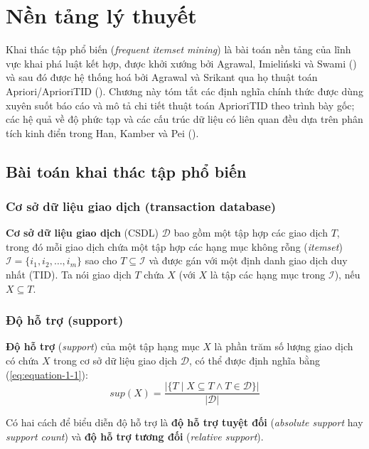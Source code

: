 \chapter[Nền tảng lý thuyết]{Nền tảng lý thuyết}
\label{cp:theoretical-foundation}

Khai thác tập phổ biến (\textit{frequent itemset mining}) là bài toán nền tảng của lĩnh vực khai phá luật kết hợp, được khởi xướng bởi Agrawal, Imieliński và Swami (\cite{AgrawalImielinskiSwami1993}) và sau đó được hệ thống hoá bởi Agrawal và Srikant qua họ thuật toán Apriori/AprioriTID (\cite{AgrawalSrikant1994}). Chương này tóm tắt các định nghĩa chính thức được dùng xuyên suốt báo cáo và mô tả chi tiết thuật toán AprioriTID theo trình bày gốc; các hệ quả về độ phức tạp và các cấu trúc dữ liệu có liên quan đều dựa trên phân tích kinh điển trong Han, Kamber và Pei (\cite{HanKamberPei2011}).

\section{Bài toán khai thác tập phổ biến}

\subsection{Cơ sở dữ liệu giao dịch (transaction database)}
\textbf{Cơ sở dữ liệu giao dịch} (CSDL) $\mathcal{D}$ bao gồm một tập hợp các giao dịch $T$, trong đó mỗi giao dịch chứa một tập hợp các hạng mục không rỗng (\textit{itemset}) $\mathcal{I} = \{i_1, i_2, \ldots, i_m\}$ sao cho $T \subseteq \mathcal{I}$ và được gán với một định danh giao dịch duy nhất (TID). Ta nói giao dịch $T$ chứa $X$ (với $X$ là tập các hạng mục trong $\mathcal{I}$), nếu $X \subseteq T$.

\subsection{Độ hỗ trợ (support)}
\textbf{Độ hỗ trợ} (\textit{support}) của một tập hạng mục $X$ là phần trăm số lượng giao dịch có chứa $X$ trong cơ sở dữ liệu giao dịch $\mathcal{D}$, có thể được định nghĩa bằng (\ref{eq:equation-1-1}):
\begin{equation}
    \label{eq:equation-1-1}
    \textit{sup}(X) = \frac{|\{T \mid X \subseteq T \land T \in \mathcal{D}\}|}{|\mathcal{D}|}
\end{equation}
    
Có hai cách để biểu diễn độ hỗ trợ là \textbf{độ hỗ trợ tuyệt đối} (\textit{absolute support} hay \textit{support count}) và \textbf{độ hỗ trợ tương đối} (\textit{relative support}).

